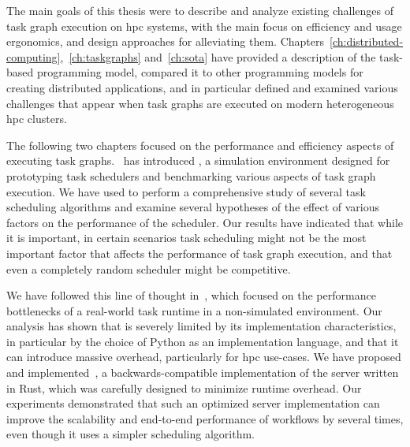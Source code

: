 The main goals of this thesis were to describe and analyze existing challenges of task graph
execution on \gls{hpc} systems, with the main focus on efficiency and usage
ergonomics, and design approaches for alleviating them.
Chapters~\ref{ch:distributed-computing},~\ref{ch:taskgraphs} and~\ref{ch:sota} have
provided a description of the task-based programming model, compared it to other programming models
for creating distributed applications, and in particular defined and examined various challenges
that appear when task graphs are executed on modern heterogeneous \gls{hpc}
clusters.

The following two chapters focused on the performance and efficiency aspects of executing task
graphs.~ has introduced \estee{}, a simulation
environment designed for prototyping task schedulers and benchmarking various aspects of task graph
execution. We have used \estee{} to perform a comprehensive study of several task
scheduling algorithms and examine several hypotheses of the effect of various factors on the
performance of the scheduler. Our results have indicated that while it is important, in certain
scenarios task scheduling might not be the most important factor that affects the performance of
task graph execution, and that even a completely random scheduler might be competitive.

We have followed this line of thought in~, which focused on the
performance bottlenecks of a real-world task runtime \dask{} in a non-simulated
environment. Our analysis has shown that \dask{} is severely limited by its
implementation characteristics, in particular by the choice of Python as an implementation
language, and that it can introduce massive overhead, particularly for \gls{hpc}
use-cases. We have proposed and implemented~\rsds{}, a backwards-compatible
implementation of the \dask{} server written in Rust, which was carefully
designed to minimize runtime overhead. Our experiments demonstrated that such an optimized server
implementation can improve the scalability and end-to-end performance of \dask{}
workflows by several times, even though it uses a simpler scheduling algorithm.

